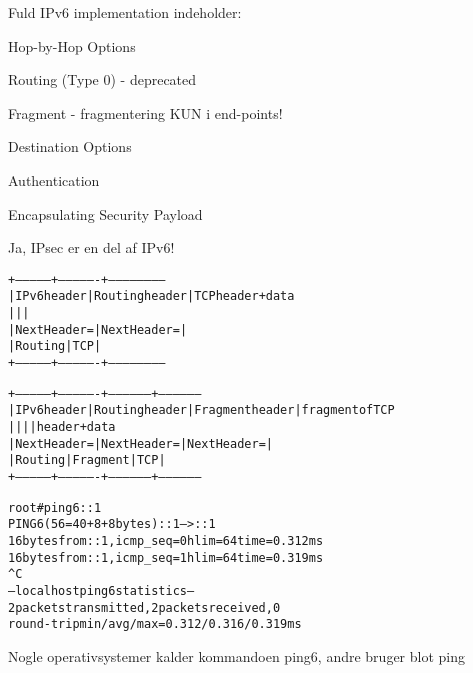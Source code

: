 \documentclass[Screen16to9,17pt]{foils}
\begin{document}

\begin{list1}
\item Fuld IPv6 implementation indeholder:
\begin{list2}
\item Hop-by-Hop Options
\item Routing (Type 0) - deprecated
\item Fragment - fragmentering KUN i end-points!
\item Destination Options
\item Authentication
\item Encapsulating Security Payload
\end{list2}
\item Ja, IPsec er en del af IPv6!
\end{list1}


\begin{alltt}
\small
  +---------------+----------------+------------------------
  |  IPv6 header  | Routing header | TCP header + data
  |               |                |
  | Next Header = |  Next Header = |
  |    Routing    |      TCP       |
  +---------------+----------------+------------------------

  +---------------+----------------+-----------------+-----------------
  |  IPv6 header  | Routing header | Fragment header | fragment of TCP
  |               |                |                 |  header + data
  | Next Header = |  Next Header = |  Next Header =  |
  |    Routing    |    Fragment    |       TCP       |
  +---------------+----------------+-----------------+-----------------
\end{alltt}



\begin{alltt}
\small
root# ping6 ::1
PING6(56=40+8+8 bytes) ::1 --> ::1
16 bytes from ::1, icmp_seq=0 hlim=64 time=0.312 ms
16 bytes from ::1, icmp_seq=1 hlim=64 time=0.319 ms
^C
--- localhost ping6 statistics ---
2 packets transmitted, 2 packets received, 0% packet loss
round-trip min/avg/max = 0.312/0.316/0.319 ms
\end{alltt}

Nogle operativsystemer kalder kommandoen ping6, andre bruger blot ping

\end{document}
